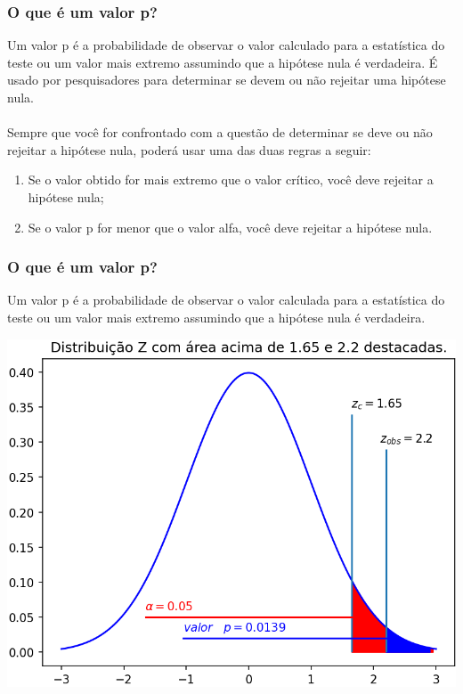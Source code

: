 \documentclass[11pt]{beamer}
\begin{document}
\begin{frame}
\frametitle{O que é um valor p?}
Um valor p é a probabilidade de observar o valor calculado para a estatística do teste ou um valor mais extremo assumindo que a hipótese nula é verdadeira. É usado por pesquisadores para determinar se devem ou não rejeitar uma hipótese nula.\\~\\
Sempre que você for confrontado com a questão de determinar se deve ou não rejeitar a hipótese nula, poderá usar uma das duas regras a seguir:

\begin{enumerate}
\item Se o valor obtido for mais extremo que o valor crítico, você deve rejeitar a hipótese nula;
\item Se o valor p for menor que o valor alfa, você deve rejeitar a hipótese nula.
\end{enumerate}

\end{frame}

\begin{frame}
\frametitle{O que é um valor p?}
Um valor p é a probabilidade de observar o valor calculada para a estatística do teste ou um valor mais extremo assumindo que a hipótese nula é verdadeira.

\begin{center}\includegraphics[width=0.6\linewidth]{figs/regiao_critica_valorp.png} \end{center}
\end{frame}
\end{document}
